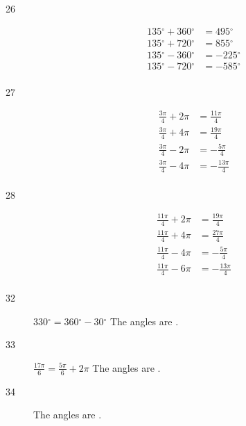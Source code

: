 \documentclass{exam}
\newcommand{\degree}{\ensuremath{^\circ}}
\begin{document}
\begin{description}
      \item[26] 
        \begin{align*}
          135 \degree + 360 \degree & = \boxed{ 495 \degree } \\
          135 \degree + 720 \degree & = \boxed{ 855 \degree } \\
          135 \degree - 360 \degree & = \boxed{ -225 \degree } \\
          135 \degree - 720 \degree & = \boxed{ -585 \degree } \\
        \end{align*}

      \item[27] 
        \begin{align*}
          \frac{3 \pi}{4} + 2 \pi & = \boxed{ \frac{11 \pi}{4} } \\
          \frac{3 \pi}{4} + 4 \pi & = \boxed{ \frac{19 \pi}{4} } \\
          \frac{3 \pi}{4} - 2 \pi & = \boxed{ - \frac{5 \pi}{4} } \\
          \frac{3 \pi}{4} - 4 \pi & = \boxed{ - \frac{13 \pi}{4} } \\
        \end{align*}

      \item[28] 
        \begin{align*}
          \frac{11 \pi}{4} + 2 \pi & = \boxed{ \frac{19 \pi}{4} } \\
          \frac{11 \pi}{4} + 4 \pi & = \boxed{ \frac{27 \pi}{4} } \\
          \frac{11 \pi}{4} - 4 \pi & = \boxed{ - \frac{5 \pi}{4} } \\
          \frac{11 \pi}{4} - 6 \pi & = \boxed{ - \frac{13 \pi}{4} } \\
        \end{align*}


      \item[32] $330 \degree = 360 \degree - 30 \degree$
        The angles are .

      \item[33] $\frac{17 \pi}{6} = \frac{5 \pi}{6} + 2 \pi$
        The angles are .

      \item[34] The angles are .


\end{description}
\end{document}
